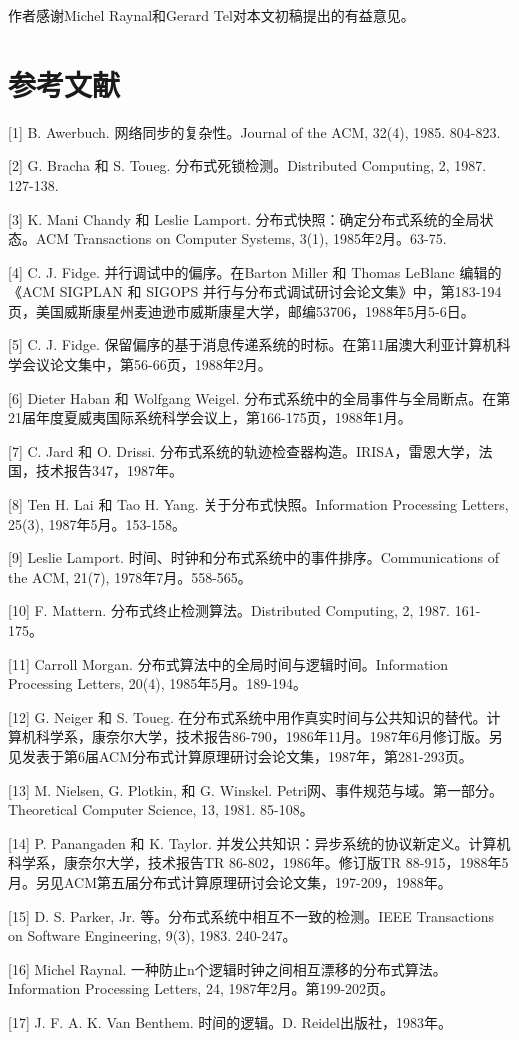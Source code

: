 \documentclass[12pt,a4paper]{report} %
\begin{document}
作者感谢Michel Raynal和Gerard Tel对本文初稿提出的有益意见。

\section*{参考文献}

[1] B. Awerbuch. 网络同步的复杂性。Journal of the ACM, 32(4), 1985. 804-823.

[2] G. Bracha 和 S. Toueg. 分布式死锁检测。Distributed Computing, 2, 1987. 127-138.

[3] K. Mani Chandy 和 Leslie Lamport. 分布式快照：确定分布式系统的全局状态。ACM Transactions on Computer Systems, 3(1), 1985年2月。63-75.

[4] C. J. Fidge. 并行调试中的偏序。在Barton Miller 和 Thomas LeBlanc 编辑的《ACM SIGPLAN 和 SIGOPS 并行与分布式调试研讨会论文集》中，第183-194页，美国威斯康星州麦迪逊市威斯康星大学，邮编53706，1988年5月5-6日。

[5] C. J. Fidge. 保留偏序的基于消息传递系统的时标。在第11届澳大利亚计算机科学会议论文集中，第56-66页，1988年2月。

[6] Dieter Haban 和 Wolfgang Weigel. 分布式系统中的全局事件与全局断点。在第21届年度夏威夷国际系统科学会议上，第166-175页，1988年1月。

[7] C. Jard 和 O. Drissi. 分布式系统的轨迹检查器构造。IRISA，雷恩大学，法国，技术报告347，1987年。

[8] Ten H. Lai 和 Tao H. Yang. 关于分布式快照。Information Processing Letters, 25(3), 1987年5月。153-158。

[9] Leslie Lamport. 时间、时钟和分布式系统中的事件排序。Communications of the ACM, 21(7), 1978年7月。558-565。

[10] F. Mattern. 分布式终止检测算法。Distributed Computing, 2, 1987. 161-175。

[11] Carroll Morgan. 分布式算法中的全局时间与逻辑时间。Information Processing Letters, 20(4), 1985年5月。189-194。

[12] G. Neiger 和 S. Toueg. 在分布式系统中用作真实时间与公共知识的替代。计算机科学系，康奈尔大学，技术报告86-790，1986年11月。1987年6月修订版。另见发表于第6届ACM分布式计算原理研讨会论文集，1987年，第281-293页。

[13] M. Nielsen, G. Plotkin, 和 G. Winskel. Petri网、事件规范与域。第一部分。Theoretical Computer Science, 13, 1981. 85-108。

[14] P. Panangaden 和 K. Taylor. 并发公共知识：异步系统的协议新定义。计算机科学系，康奈尔大学，技术报告TR 86-802，1986年。修订版TR 88-915，1988年5月。另见ACM第五届分布式计算原理研讨会论文集，197-209，1988年。

[15] D. S. Parker, Jr. 等。分布式系统中相互不一致的检测。IEEE Transactions on Software Engineering, 9(3), 1983. 240-247。

[16] Michel Raynal. 一种防止n个逻辑时钟之间相互漂移的分布式算法。Information Processing Letters, 24, 1987年2月。第199-202页。

[17] J. F. A. K. Van Benthem. 时间的逻辑。D. Reidel出版社，1983年。

\end{document}

